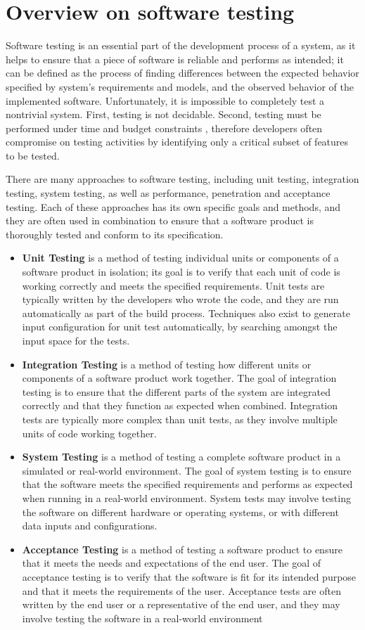 \section{Overview on software testing}
Software testing is an essential part of the development process of a system, as it helps to ensure that a piece of software is reliable and performs as intended; it can be defined as the process of finding differences between the expected behavior specified by system's requirements and models, and the observed behavior of the implemented software. Unfortunately, it is impossible to completely test a nontrivial system. First, testing is not decidable. Second, testing must be performed under time and budget constraints \cite{OOSE}, therefore developers often compromise on testing activities by identifying only a critical subset of features to be tested.

There are many approaches to software testing, including unit testing, integration testing, system testing, as well as performance, penetration and acceptance testing. Each of these approaches has its own specific goals and methods, and they are often used in combination to ensure that a software product is thoroughly tested and conform to its specification.
\begin{itemize}
    \item \textbf{Unit Testing} is a method of testing individual units or components of a software product in isolation; its goal is to verify that each unit of code is working correctly and meets the specified requirements. Unit tests are typically written by the developers who wrote the code, and they are run automatically as part of the build process. Techniques also exist to generate input configuration for unit test automatically, by searching amongst the input space for the tests.
    \item \textbf{Integration Testing} is a method of testing how different units or components of a software product work together. The goal of integration testing is to ensure that the different parts of the system are integrated correctly and that they function as expected when combined. Integration tests are typically more complex than unit tests, as they involve multiple units of code working together.
    \item \textbf{System Testing} is a method of testing a complete software product in a simulated or real-world environment. The goal of system testing is to ensure that the software meets the specified requirements and performs as expected when running in a real-world environment. System tests may involve testing the software on different hardware or operating systems, or with different data inputs and configurations.
    \item \textbf{Acceptance Testing} is a method of testing a software product to ensure that it meets the needs and expectations of the end user. The goal of acceptance testing is to verify that the software is fit for its intended purpose and that it meets the requirements of the user. Acceptance tests are often written by the end user or a representative of the end user, and they may involve testing the software in a real-world environment
\end{itemize}


